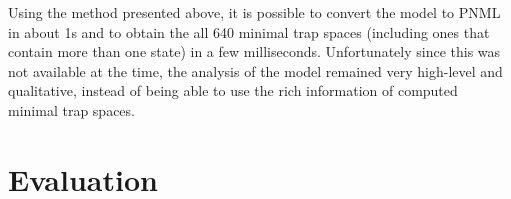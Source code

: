 \documentclass[runningheads]{llncs}
\newcommand{\vangiang}[1]{\textcolor{magenta}{#1}}
\newcommand{\sylvain}[1]{\textcolor{teal}{#1}}
\begin{document}
Using the method presented above, it is possible to convert the model to PNML in about 1s and to obtain the all 640 minimal trap spaces (including ones that contain more than one state) in a few milliseconds.
Unfortunately since this was not available at the time, the analysis of the model remained very high-level and qualitative, instead of being able to use the rich information of computed minimal trap spaces.


\section{Evaluation}
\label{sec:eval}
\end{document}
